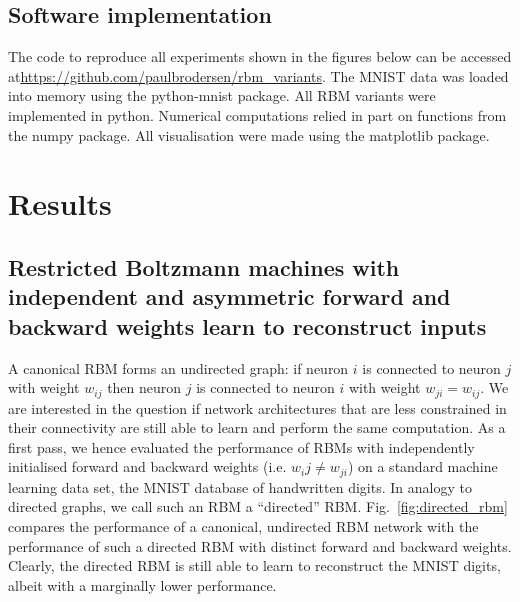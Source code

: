 \documentclass[11pt]{article}
\begin{document}

\subsection{Software implementation}

The code to reproduce all experiments shown in the figures below can
be accessed at\url{https://github.com/paulbrodersen/rbm_variants}.
The MNIST data was loaded into memory using the python-mnist
package. All RBM variants were implemented in python. Numerical
computations relied in part on functions from the numpy package. All
visualisation were made using the matplotlib package.

\section{Results}

\subsection{Restricted Boltzmann machines with independent and asymmetric forward and backward weights learn to reconstruct inputs}

A canonical RBM forms an undirected graph: if neuron $i$ is connected
to neuron $j$ with weight $w_{ij}$ then neuron $j$ is connected to
neuron $i$ with weight $w_{ji} = w_{ij}$. We are interested in the
question if network architectures that are less constrained in their
connectivity are still able to learn and perform the same
computation. As a first pass, we hence evaluated the performance of
RBMs with independently initialised forward and backward weights
(i.e. $w_ij \neq w_{ji}$) on a standard machine learning data set, the
MNIST database of handwritten digits. In analogy to directed graphs,
we call such an RBM a ``directed'' RBM. Fig.~\ref{fig:directed_rbm}
compares the performance of a canonical, undirected RBM network with
the performance of such a directed RBM with distinct forward and
backward weights. Clearly, the directed RBM is still able to learn to
reconstruct the MNIST digits, albeit with a marginally lower
performance.
\end{document}
